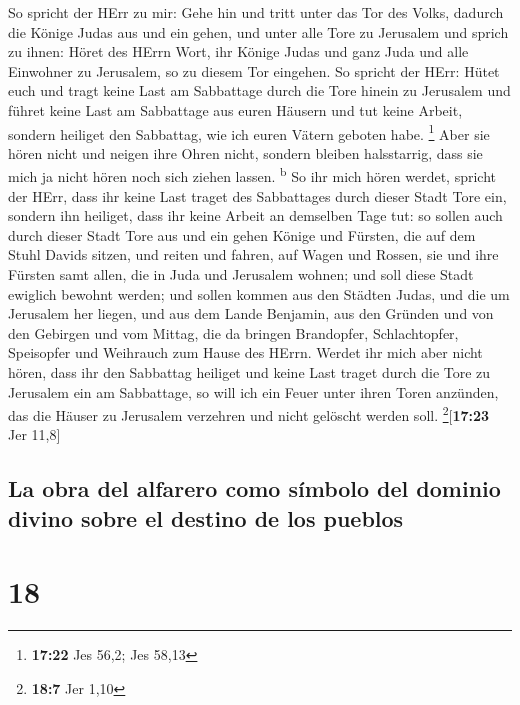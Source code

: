  So spricht der HErr zu mir: Gehe hin und tritt unter das
Tor des Volks, dadurch die Könige Judas aus und ein gehen, und unter
alle Tore zu Jerusalem  und sprich zu ihnen: Höret des
HErrn Wort, ihr Könige Judas und ganz Juda und alle Einwohner zu
Jerusalem, so zu diesem Tor eingehen.  So spricht der
HErr: Hütet euch und tragt keine Last am Sabbattage durch die Tore
hinein zu Jerusalem  und führet keine Last am Sabbattage
aus euren Häusern und tut keine Arbeit, sondern heiliget den Sabbattag,
wie ich euren Vätern geboten habe. \footnote{\textbf{17:22} Jes 56,2;
  Jes 58,13}  Aber sie hören nicht und neigen ihre Ohren
nicht, sondern bleiben halsstarrig, dass sie mich ja nicht hören noch
sich ziehen lassen. \textsuperscript{b}  So ihr mich
hören werdet, spricht der HErr, dass ihr keine Last traget des
Sabbattages durch dieser Stadt Tore ein, sondern ihn heiliget, dass ihr
keine Arbeit an demselben Tage tut:  so sollen auch durch
dieser Stadt Tore aus und ein gehen Könige und Fürsten, die auf dem
Stuhl Davids sitzen, und reiten und fahren, auf Wagen und Rossen, sie
und ihre Fürsten samt allen, die in Juda und Jerusalem wohnen; und soll
diese Stadt ewiglich bewohnt werden;  und sollen kommen
aus den Städten Judas, und die um Jerusalem her liegen, und aus dem
Lande Benjamin, aus den Gründen und von den Gebirgen und vom Mittag, die
da bringen Brandopfer, Schlachtopfer, Speisopfer und Weihrauch zum Hause
des HErrn.  Werdet ihr mich aber nicht hören, dass ihr
den Sabbattag heiliget und keine Last traget durch die Tore zu Jerusalem
ein am Sabbattage, so will ich ein Feuer unter ihren Toren anzünden, das
die Häuser zu Jerusalem verzehren und nicht gelöscht werden soll.
\footnote{\textbf{18:7} Jer 1,10}{[}\textbf{17:23} Jer 11,8{]}

\hypertarget{la-obra-del-alfarero-como-suxedmbolo-del-dominio-divino-sobre-el-destino-de-los-pueblos}{%
\subsection{La obra del alfarero como símbolo del dominio divino sobre
el destino de los
pueblos}\label{la-obra-del-alfarero-como-suxedmbolo-del-dominio-divino-sobre-el-destino-de-los-pueblos}}

\hypertarget{section-17}{%
\section{18}\label{section-17}}

